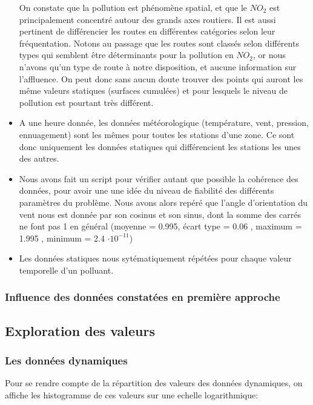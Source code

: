\begin{itemize}
\begin{center}
    \end{center}
    On constate que la pollution est phénomène spatial, et que le $NO_2$ est principalement concentré autour des grands axes routiers. Il est aussi pertinent de différencier les routes en différentes catégories selon leur fréquentation. Notons au passage que les routes sont classés selon différents types qui semblent être déterminants pour la pollution en $NO_2$, or nous n'avons qu'un type de route à notre disposition, et aucune information sur l'affluence. On peut donc sans aucun doute trouver des points qui auront les même valeurs statiques (surfaces cumulées) et pour lesquels le niveau de pollution est pourtant très différent.
  \item
    A une heure donnée, les données météorologique (température, vent, pression, ennuagement) sont les mêmes pour toutes les stations d'une zone.
    Ce sont donc uniquement les données statiques qui différencient les stations les unes des autres.
  \item
    Nous avons fait un script pour vérifier autant que possible la cohérence des données, pour avoir une une idée du niveau de fiabilité des différents paramètres du problème. Nous avons alors repéré que l'angle d'orientation du vent nous est donnée par son cosinus et son sinus, dont la somme des carrés ne font pas 1 en général (moyenne = 0.995, écart type =  0.06 , maximum =  1.995 , minimum = 2.4 $\cdot 10^{-11}$)
  \item
    Les données statiques nous sytématiquement répétées pour chaque valeur temporelle d'un polluant. %
    
\end{itemize}

\subsubsection{Influence des données constatées en première approche}

\subsection{Exploration des valeurs}

\subsubsection{Les données dynamiques}

Pour se rendre compte de la répartition des valeurs des données dynamiques, on affiche les histogramme de ces valeurs sur une echelle logarithmique:

